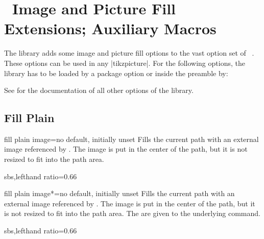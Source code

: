 \clearpage
\section{\tikzname\ Image and Picture Fill Extensions; Auxiliary Macros}\label{sec:tikzimagefilling}%
%
The  library adds some image and picture fill options to the vast option set of
\tikzname\ \cite{tantau:2015a}. These options can be used in any |tikzpicture|.
For the following options, the  library has to be loaded
by a package option or inside the preamble by:
\begin{dispListing}
\end{dispListing}

See  for the documentation of all other options of the  library.

\subsection{Fill Plain}
\begin{docTikzKey}{fill plain image}{=}{no default, initially unset}
  Fills the current path with an external image referenced by .
  The image is put in the center of the path, but it is not resized to fit into
  the path area.
\begin{dispExample*}{sbs,lefthand ratio=0.66}
\end{dispExample*}
\end{docTikzKey}


\begin{docTikzKey}{fill plain image*}{=}{no default, initially unset}
  Fills the current path with an external image referenced by .
  The image is put in the center of the path, but it is not resized to fit into
  the path area.
  The  are given to the underlying  command.
\begin{dispExample*}{sbs,lefthand ratio=0.66}
\end{dispExample*}
\end{docTikzKey}


